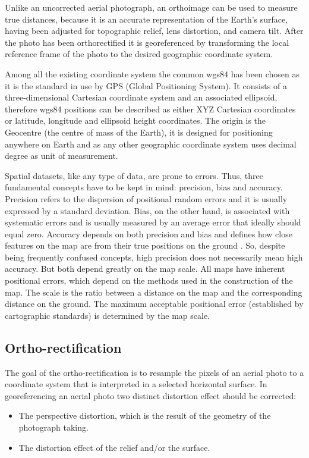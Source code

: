 Unlike an uncorrected aerial photograph, an orthoimage can be used to measure true distances, because it is an accurate representation of the Earth's surface, having been adjusted for topographic relief, lens distortion, and camera tilt.
After the photo has been orthorectified it is georeferenced by transforming the local reference frame of the photo to the desired geographic coordinate system.\par
Among all the existing coordinate system the common \acrshort{wgs84} has been chosen as it is the standard in use by GPS (Global Positioning System). It consists of a three-dimensional Cartesian coordinate system and an associated ellipsoid, therefore \acrshort{wgs84} positions can be described as either XYZ Cartesian coordinates or latitude, longitude and ellipsoid height coordinates. The origin is the Geocentre (the centre of mass of the Earth), it is designed for positioning anywhere on Earth and as any other geographic coordinate system uses decimal degree as unit of measurement.\par
{}
Spatial datasets, like any type of data, are prone to errors. Thus, three fundamental concepts have to be kept in mind: precision, bias and accuracy. Precision refers to the dispersion of positional random errors and it is usually expressed by a standard deviation. Bias, on the other hand, is associated with systematic errors and is usually measured by an average error that ideally should equal zero. Accuracy depends on both precision and bias and defines how close features on the map are from their true positions on the ground \cite{geoInformationSystem}. So, despite being frequently confused concepts, high precision does not necessarily mean high accuracy. But both depend greatly on the map scale. All maps have inherent positional errors, which depend on the methods used in the construction of the map. The scale is the ratio between a distance on the map and the corresponding distance on the ground. The maximum acceptable positional error (established by cartographic standards) is determined by the map scale.

\subsection{Ortho-rectification} %
\label{sub:ortho_rectification}
The goal of the ortho-rectification is to resample the pixels of an aerial photo to a coordinate system that is interpreted in a selected horizontal surface.
In georeferencing an aerial photo two distinct distortion effect should be corrected:
\begin{itemize}
	\item The perspective distortion, which is the result of the geometry of the photograph taking.
	\item The distortion effect of the relief and/or the surface.
\end{itemize}

